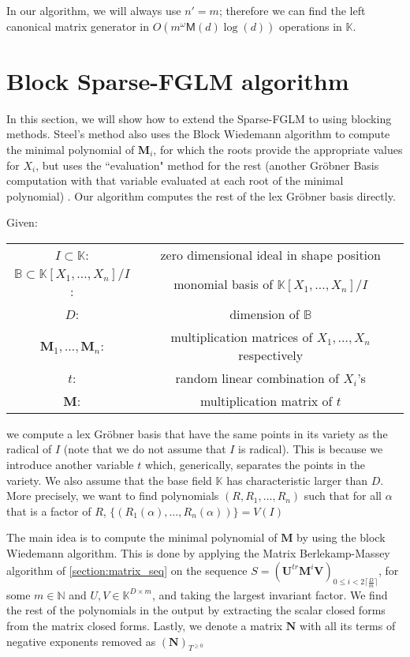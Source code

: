 \documentclass[12pt]{article}
\newcommand{\field}{\mathbb{K}} %
\newcommand{\rdim}{m} %
\newcommand{\cdim}{n'} %
\newcommand{\degBd}{d} %
\def\K {\ensuremath{\mathbb{K}}}
\def\K{\mathbb{K}}
\def\mM{\mathbf{M}}
\def\mN{\mathbf{N}}
\def\mU{\mathbf{U}}
\def\mV{\mathbf{V}}
\begin{document}
In our algorithm, we will always use $\cdim = \rdim$; therefore we can find the
left canonical matrix generator in $O(\rdim^\omega \mathsf{M}(\degBd) \log(\degBd))$
operations in $\field$.


\newpage
\section{Block Sparse-FGLM algorithm}
In this section, we will show how to extend the Sparse-FGLM
to using blocking methods. Steel's method also uses the
Block Wiedemann algorithm to compute the minimal polynomial
of $\mM_i$, for which the roots provide the appropriate
values for $X_i$,
but uses the ``evaluation" method for the rest
(another Gr\"obner Basis computation with that variable
evaluated at each root of the minimal polynomial) \cite{Steel15}.
Our algorithm computes the rest of the lex
Gr\"obner basis directly.

Given:
\begin{center}
	\begin{tabular}{c c}
		$I \subset \mathbb{K}$:& zero dimensional ideal
		in shape position\\
		$\mathbb{B} \subset \mathbb{K}[X_1,\dots,X_n]/I$:&
		monomial basis of $\mathbb{K}[X_1,\dots,X_n]/I$\\
		$D$: & dimension of $\mathbb{B}$\\
		$\mM_1, \dots,\mM_n$:& multiplication matrices of
		$X_1 ,\dots,X_n$ respectively\\
		$t$:& random linear combination of $X_i$'s\\
		$\mM$:& multiplication matrix of $t$
	\end{tabular}
\end{center}
we compute a lex Gr\"obner basis that have the same points
in its variety as the radical of $I$ 
(note that we do not assume that $I$ is radical).
This is because we introduce another variable $t$ which,
generically, separates the points in the variety.
We also assume that the base field $\K$ has characteristic
larger than $D$. More precisely, we want to find polynomials
$(R,R_1,\dots,R_n)$ such that for all $\alpha$ that is a factor of
$R$, $\{ (R_1(\alpha),\dots,R_n(\alpha)) \} = V(I)$

The main idea is to compute the minimal polynomial
of $\mM$ by using the block Wiedemann algorithm.
This is done by applying the Matrix Berlekamp-Massey algorithm of
\cref{section:matrix_seq} on the sequence 
$S = (\mU^{tr}\mM^i\mV)_{0 \le i < 2 \lceil \frac{D}{m} \rceil}$,
for some $m \in \mathbb{N}$ and $U,V \in \mathbb{K}^{D \times m}$,
and taking the largest invariant factor.
We find the rest of the polynomials in the output by extracting
the scalar closed forms from the matrix closed forms. Lastly,
we denote a matrix $\mN$ with all its terms of negative exponents removed
as $ (\mN)_{T^{\ge 0}} $
\end{document}
